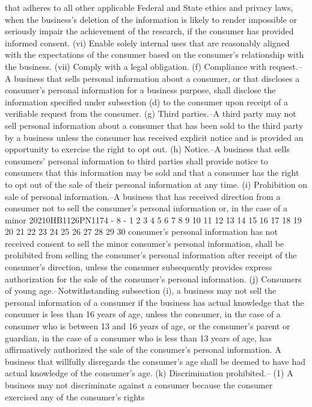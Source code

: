 that adheres to all other applicable Federal and State
ethics and privacy laws, when the business's deletion of
the information is likely to render impossible or
seriously impair the achievement of the research, if the
consumer has provided informed consent.
(vi) Enable solely internal uses that are reasonably
aligned with the expectations of the consumer based on
the consumer's relationship with the business.
(vii) Comply with a legal obligation.
(f) Compliance with request.--A business that sells personal
information about a consumer, or that discloses a consumer's
personal information for a business purpose, shall disclose the
information specified under subsection (d) to the consumer upon
receipt of a verifiable request from the consumer.
(g) Third parties.--A third party may not sell personal
information about a consumer that has been sold to the third
party by a business unless the consumer has received explicit
notice and is provided an opportunity to exercise the right to
opt out.
(h) Notice.--A business that sells consumers' personal
information to third parties shall provide notice to consumers
that this information may be sold and that a consumer has the
right to opt out of the sale of their personal information at
any time.
(i) Prohibition on sale of personal information.--A business
that has received direction from a consumer not to sell the
consumer's personal information or, in the case of a minor
20210HB1126PN1174 - 8 -
1
2
3
4
5
6
7
8
9
10
11
12
13
14
15
16
17
18
19
20
21
22
23
24
25
26
27
28
29
30
consumer's personal information has not received consent to sell
the minor consumer's personal information, shall be prohibited
from selling the consumer's personal information after receipt
of the consumer's direction, unless the consumer subsequently
provides express authorization for the sale of the consumer's
personal information.
(j) Consumers of young age.--Notwithstanding subsection (i),
a business may not sell the personal information of a consumer
if the business has actual knowledge that the consumer is less
than 16 years of age, unless the consumer, in the case of a
consumer who is between 13 and 16 years of age, or the
consumer's parent or guardian, in the case of a consumer who is
less than 13 years of age, has affirmatively authorized the sale
of the consumer's personal information. A business that
willfully disregards the consumer's age shall be deemed to have
had actual knowledge of the consumer's age.
(k) Discrimination prohibited.--
(1) A business may not discriminate against a consumer
because the consumer exercised any of the consumer's rights
